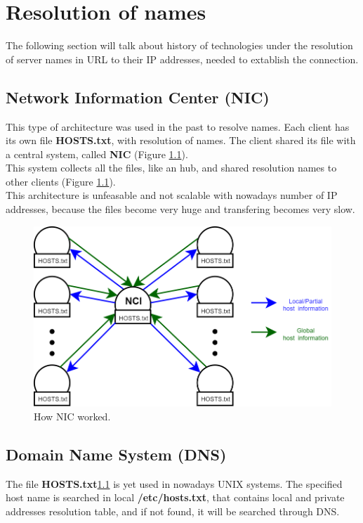 \chapter{Resolution of names}
The following section will talk about history of technologies under the resolution of server names in URL to their IP addresses, needed to extablish the connection.

\section{Network Information Center (NIC)}\label{NIC_section}
This type of architecture was used in the past to resolve names. Each client has its own file \textbf{HOSTS.txt}, with resolution of names. The client shared its file with a central system, called \textbf{NIC} (Figure \ref{NIC}).\\
This system collects all the files, like an hub, and shared resolution names to other clients (Figure \ref{NIC}).\\
This architecture is unfeasable and not scalable with nowadays number of IP addresses, because the files become very huge and transfering becomes very slow.\\
\begin{figure}[h]
\centering
\includegraphics[scale=0.4]{Images/Resolution/NIC}
\caption{\footnotesize{How NIC worked.}}\label{NIC}
\end{figure}


\section{Domain Name System (DNS)}\label{DNS_system}
The file \textbf{HOSTS.txt}\ref{NIC_section} is yet used in nowadays UNIX systems. The specified host name is searched in local \textbf{/etc/hosts.txt}, that contains local and private addresses resolution table, and if not found, it will be searched through DNS\cite{RFC1034}.

